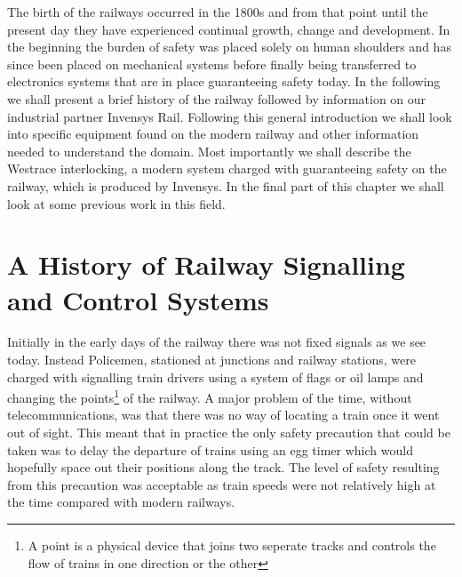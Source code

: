 The birth of the railways occurred in the 1800s and from that point until the present day they have experienced continual growth, change and development. In the beginning the burden of safety was placed solely on human shoulders and has since been placed on mechanical systems before finally being transferred to electronics systems that are in place guaranteeing safety today. In the following we shall present a brief history of the railway followed by information on our industrial partner Invensys Rail.  Following this general introduction we shall look into specific equipment found on the modern railway and other information needed to understand the domain. Most importantly we shall describe the Westrace interlocking, a modern system charged with guaranteeing safety on the railway, which is produced by Invensys. In the final part of this chapter we shall look at some previous work in this field.


\begin{comment}
From their birth in the 1800s to the present day, the railway and its control
systems have seen many advances. Its control and safety has gone from being a
completely manual human based system, to a mechanical system and finally to the electronic
system we see today. We will now look at a brief history of the railway
followed by information on our industrial partner Invensys Rail. We then look
more closely at modern railways and the equipment which constitutes
them. We also study
Westrace interlocking which is produced by Invensys and the
ladder logic programs which run on it. Finally, we look at some previous work
in this field.
\end{comment}

\section{ A History of Railway Signalling and Control Systems}
Initially in the early days of the railway there was not fixed signals as we see today. Instead Policemen, stationed at junctions and railway stations, were charged with signalling train drivers using a system of flags or oil lamps and changing the points\footnote{A point is a physical device that joins two seperate tracks and controls the flow of trains in one direction or the other} of the railway. A major problem of the time, without telecommunications, was that there was no way of locating a train once it went out of sight. This meant that in practice the only safety precaution that could be taken was to delay the departure of trains using an egg timer which would hopefully space out their positions along the track. The level of safety resulting from this precaution was acceptable as train speeds were not relatively high at the time compared with modern railways.


